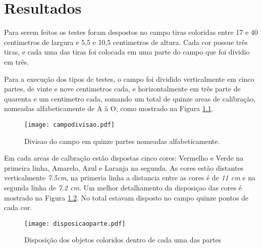 \chapter{Resultados} 


	Para serem feitos os testes foram despostos no campo tiras coloridas entre 17 e 40 centimetros de largura e  5,5 e 10,5 centimetros de altura. Cada cor possue três tiras, e cada uma das tiras foi colocada em uma parte do campo que foi dividio em três.


Para a execução dos tipos de testes, o campo foi dividido verticalmente em cinco partes, de vinte e nove centimetros cada, e horizontalmente em três parte de quarenta e um centimetro cada, somando um total de quinze areas de calibração, nomeadas alfabeticamente de A à O, como mostrado na Figura \ref{campodivisao}.

\begin{figure}[!: h]
		\centering
		\texttt{[image: campodivisao.pdf]}
		\caption{Divisao do campo em quinze partes nomeadas alfabeticamente.}
		\label{campodivisao}
	\end{figure}
	
Em cada areas de calbração estão dispostas cinco cores: Vermelho  e Verde na primeira linha, Amarelo, Azul e Laranja na segunda. As cores estão distantes verticalmente \textit{7.5cm}, na primeria linha a distancia entre as cores é  de \textit{11 cm} e na segunda linha de \textit{7.2 cm}. Um  melhor detalhamento da disposiçao das cores é  mostrado na Figura \ref{disposicaoparte}. No total estavam disposto no campo quinze pontos de cada cor.

\begin{figure}[!: h]
		\centering
		\texttt{[image: disposicaoparte.pdf]}
		\caption{Disposição dos objetos coloridos dentro de cada uma das partes}
		\label{disposicaoparte}
	\end{figure}
	\newpage
